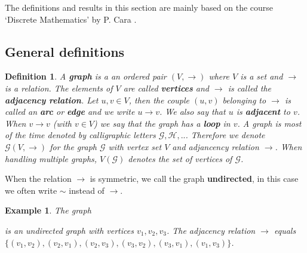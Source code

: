 \documentclass[a4paper,11pt]{report}
\newtheorem{example}[theorem]{Example}
\newtheorem{definition}[theorem]{Definition}
\newcommand{\graf}{\mathscr{G}}
\begin{document}
The definitions and results in this section are mainly based on the course 
`Discrete Mathematics' by P. Cara \cite{cara}. 


\subsection{General definitions}
\begin{definition}\label{defgraf}
  A \textbf{graph} is a an ordered pair $(V,\rightarrow)$ where $V$ is a set and $\to$ is a relation. The elements of $V$ are called
 \textbf{vertices} and $\rightarrow$ is called the \textbf{adjacency relation}. Let $u, v \in V$, then the couple 
 $(u, v)$ belonging to $\to$ is called an \textbf{arc} or \textbf{edge} and we write $u \rightarrow v$. We also
 say that $u$ is \textbf{adjacent} to $v$.  When $v \to v$ (with $v \in V$) we say that the graph has a 
 \textbf{loop} in $v$. A graph is 
  most of the time denoted by calligraphic letters $\mathscr{G}, 
  \mathscr{H},..$. Therefore we denote $\mathscr{G} (V,\rightarrow)$ for the graph $\graf$ with vertex set $V$ and adjancency relation $\to$. 
  When handling multiple graphs, $V(\mathscr{G})$ denotes the set of vertices of 
  $\mathscr{G}$.
  \end{definition}
 When the relation $\rightarrow$ is symmetric, 
 we call the graph \textbf{undirected}, in this case we often write $\sim$ instead 
 of $\rightarrow$.  
 
 
 \begin{example}\label{simpelegraf}
  The graph
  \begin{center}

\end{center}
is an undirected graph with vertices $v_1, v_2, v_3$. The adjacency 
relation $\to$ equals \\$\{(v_1,v_2), (v_2,v_1), (v_2, v_3), (v_3,v_2), (v_3, v_1), 
(v_1,v_3)\}$.
\end{example}
\end{document}
